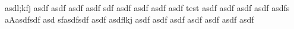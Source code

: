 asdl;kfj asdf asdf asdf asdf sdf asdf asdf asdf asdf test asdf asdf asdf asdf asdfs aAasdfsdf asd sfasdfsdf asdf asdflkj asdf asdf asdf asdf asdf asdf asdf
